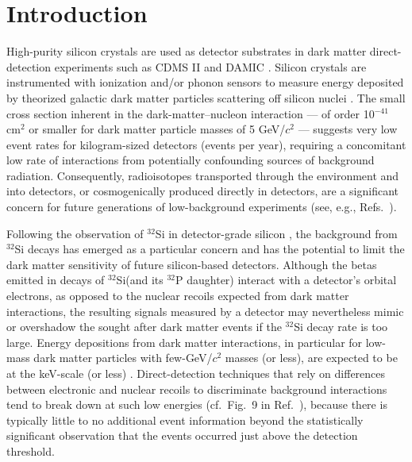 \documentclass[final,5p]{elsarticle}
\def\si{$^{32}$Si\xspace}
\def\p{$^{32}$P\xspace}
\begin{document}
\section{Introduction}\label{sec:intro}
High-purity silicon crystals are used as detector substrates in dark matter direct-detection experiments such as CDMS II \cite{cdms2_si} and DAMIC \cite{damic}. Silicon crystals are instrumented with ionization and/or phonon sensors to measure energy deposited by theorized galactic dark matter particles scattering off silicon nuclei \cite{lewin_smith}. The small cross section inherent in the dark-matter--nucleon interaction --- of order 10$^{-41}$ cm$^2$ or smaller for dark matter particle  masses of 5 GeV/$c^2$ --- suggests very low event rates for kilogram-sized detectors (events per year), requiring a concomitant low rate of interactions from potentially confounding sources of background radiation. Consequently, radioisotopes transported through the environment and into detectors, or cosmogenically produced directly in detectors, are a significant concern for future generations of low-background experiments (see, e.g., Refs.\ \cite{ARMENGAUD201751,cresst,nai}).

Following the observation of \si in detector-grade silicon \cite{damic_backgrounds}, the background from \si decays has emerged as a particular concern and has the potential to limit the dark matter sensitivity of future silicon-based detectors.
Although the betas emitted in decays of \si (and its \p daughter) interact with a detector's orbital electrons, as opposed to the nuclear recoils expected from dark matter interactions, the resulting signals measured by a detector may nevertheless mimic or overshadow the sought after dark matter events if the \si decay rate is too large. Energy depositions from dark matter interactions, in particular for low-mass dark matter particles with few-GeV/$c^2$ masses (or less), are expected to be at the keV-scale (or less) \cite{ge_diode}. Direct-detection techniques that rely on differences between electronic and nuclear recoils to discriminate background interactions tend to break down at such low energies (cf.\ Fig.\ 9 in Ref.\ \cite{cdms_shallow}), because there is typically little to no additional event information beyond the statistically significant observation that the events occurred just above the detection threshold.
\end{document}
